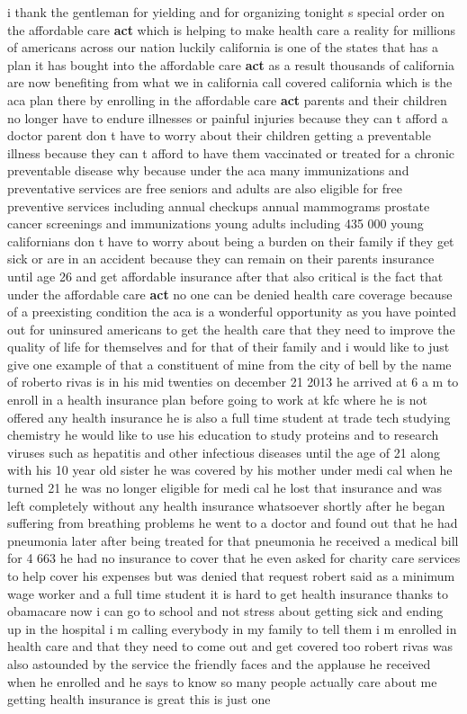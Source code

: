 \documentclass{article}
\begin{document}
\vspace{8mm}
i thank the gentleman for yielding and for organizing tonight s special order on the affordable care {\bf \color{red} act} which is helping to make health care a reality for millions of americans across our nation luckily california is one of the states that has a plan it has bought into the affordable care {\bf \color{red} act} as a result thousands of california are now benefiting from what we in california call covered california which is the aca plan there by enrolling in the affordable care {\bf \color{red} act} parents and their children no longer have to endure illnesses or painful injuries because they can t afford a doctor parent don t have to worry about their children getting a preventable illness because they can t afford to have them vaccinated or treated for a chronic preventable disease why because under the aca many immunizations and preventative services are free seniors and adults are also eligible for free preventive services including annual checkups annual mammograms prostate cancer screenings and immunizations young adults including 435 000 young californians don t have to worry about being a burden on their family if they get sick or are in an accident because they can remain on their parents insurance until age 26 and get affordable insurance after that also critical is the fact that under the affordable care {\bf \color{red} act} no one can be denied health care coverage because of a preexisting condition the aca is a wonderful opportunity as you have pointed out for uninsured americans to get the health care that they need to improve the quality of life for themselves and for that of their family and i would like to just give one example of that a constituent of mine from the city of bell by the name of roberto rivas is in his mid twenties on december 21 2013 he arrived at 6 a m to enroll in a health insurance plan before going to work at kfc where he is not offered any health insurance he is also a full time student at trade tech studying chemistry he would like to use his education to study proteins and to research viruses such as hepatitis and other infectious diseases until the age of 21 along with his 10 year old sister he was covered by his mother under medi cal when he turned 21 he was no longer eligible for medi cal he lost that insurance and was left completely without any health insurance whatsoever shortly after he began suffering from breathing problems he went to a doctor and found out that he had pneumonia later after being treated for that pneumonia he received a medical bill for 4 663 he had no insurance to cover that he even asked for charity care services to help cover his expenses but was denied that request robert said as a minimum wage worker and a full time student it is hard to get health insurance thanks to obamacare now i can go to school and not stress about getting sick and ending up in the hospital i m calling everybody in my family to tell them i m enrolled in health care and that they need to come out and get covered too robert rivas was also astounded by the service the friendly faces and the applause he received when he enrolled and he says to know so many people actually care about me getting health insurance is great this is just one 
\end{document}

